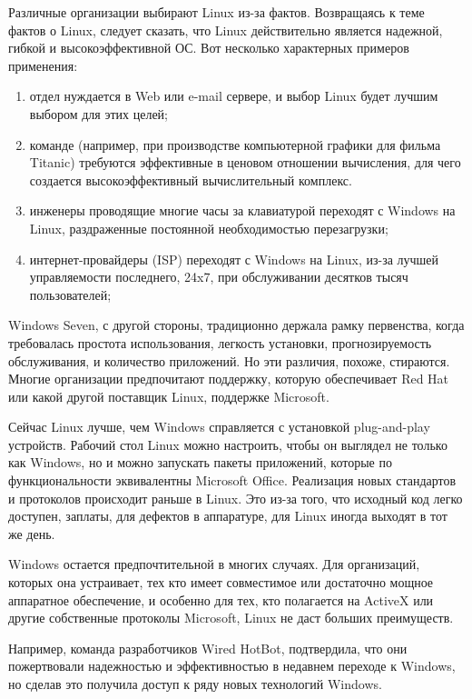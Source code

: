 \documentclass[14pt]{article}
\begin{document}
    Различные организации выбирают Linux из-за фактов. Возвращаясь к теме фактов о Linux, следует сказать, что Linux действительно является надежной, гибкой и высокоэффективной ОС. Вот несколько характерных примеров применения:
    \begin{enumerate}
        \item отдел нуждается в Web или e-mail сервере, и выбор Linux будет лучшим выбором для этих целей;
        \item команде (например, при производстве компьютерной графики для фильма Titanic) требуются эффективные в ценовом отношении вычисления, для чего создается высокоэффективный вычислительный комплекс.
        \item инженеры проводящие многие часы за клавиатурой переходят с Windows на Linux, раздраженные постоянной необходимостью перезагрузки;
        \item интернет-провайдеры (ISP) переходят с Windows на Linux, из-за лучшей управляемости последнего, 24x7, при обслуживании десятков тысяч пользователей;
    \end{enumerate}

    Windows Seven, с другой стороны, традиционно держала рамку первенства, когда требовалась простота использования, легкость установки, прогнозируемость обслуживания, и количество приложений. Но эти различия, похоже, стираются. Многие организации предпочитают поддержку, которую обеспечивает Red Hat или какой другой поставщик Linux, поддержке Microsoft.

    Сейчас Linux лучше, чем Windows справляется с установкой plug-and-play устройств. Рабочий стол Linux можно настроить, чтобы он выглядел не только как Windows, но и можно запускать пакеты приложений, которые по функциональности эквивалентны Microsoft Office. Реализация новых стандартов и протоколов происходит раньше в Linux. Это из-за того, что исходный код легко доступен, заплаты, для дефектов в аппаратуре, для Linux иногда выходят в тот же день.

    Windows остается предпочтительной в многих случаях. Для организаций, которых она устраивает, тех кто имеет совместимое или достаточно мощное аппаратное обеспечение, и особенно для тех, кто полагается на ActiveX или другие собственные протоколы Microsoft, Linux не даст больших преимуществ.

    Например, команда разработчиков Wired HotBot, подтвердила, что они пожертвовали надежностью и эффективностью в недавнем переходе к Windows, но сделав это получила доступ к ряду новых технологий Windows.
\end{document}
